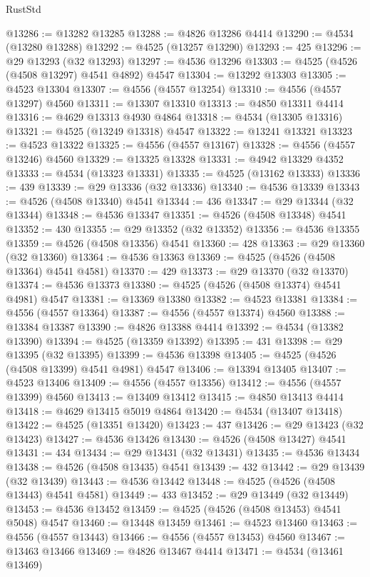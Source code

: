 \begin{lexlean}{RustStd}
\begin{coremodule}
@13286 := @13282 @13285
@13288 := @4826 @13286 @4414
@13290 := @4534 (@13280 @13288)
@13292 := @4525 (@13257 @13290)
@13293 := 425
@13296 := @29 @13293 (@32 @13293)
@13297 := @4536 @13296
@13303 := @4525 (@4526 (@4508 @13297) @4541 @4892) @4547
@13304 := @13292 @13303
@13305 := @4523 @13304
@13307 := @4556 (@4557 @13254)
@13310 := @4556 (@4557 @13297) @4560
@13311 := @13307 @13310
@13313 := @4850 @13311 @4414
@13316 := @4629 @13313 @4930 @4864
@13318 := @4534 (@13305 @13316)
@13321 := @4525 (@13249 @13318) @4547
@13322 := @13241 @13321
@13323 := @4523 @13322
@13325 := @4556 (@4557 @13167)
@13328 := @4556 (@4557 @13246) @4560
@13329 := @13325 @13328
@13331 := @4942 @13329 @4352
@13333 := @4534 (@13323 @13331)
@13335 := @4525 (@13162 @13333)
@13336 := 439
@13339 := @29 @13336 (@32 @13336)
@13340 := @4536 @13339
@13343 := @4526 (@4508 @13340) @4541
@13344 := 436
@13347 := @29 @13344 (@32 @13344)
@13348 := @4536 @13347
@13351 := @4526 (@4508 @13348) @4541
@13352 := 430
@13355 := @29 @13352 (@32 @13352)
@13356 := @4536 @13355
@13359 := @4526 (@4508 @13356) @4541
@13360 := 428
@13363 := @29 @13360 (@32 @13360)
@13364 := @4536 @13363
@13369 := @4525 (@4526 (@4508 @13364) @4541 @4581)
@13370 := 429
@13373 := @29 @13370 (@32 @13370)
@13374 := @4536 @13373
@13380 := @4525 (@4526 (@4508 @13374) @4541 @4981) @4547
@13381 := @13369 @13380
@13382 := @4523 @13381
@13384 := @4556 (@4557 @13364)
@13387 := @4556 (@4557 @13374) @4560
@13388 := @13384 @13387
@13390 := @4826 @13388 @4414
@13392 := @4534 (@13382 @13390)
@13394 := @4525 (@13359 @13392)
@13395 := 431
@13398 := @29 @13395 (@32 @13395)
@13399 := @4536 @13398
@13405 := @4525 (@4526 (@4508 @13399) @4541 @4981) @4547
@13406 := @13394 @13405
@13407 := @4523 @13406
@13409 := @4556 (@4557 @13356)
@13412 := @4556 (@4557 @13399) @4560
@13413 := @13409 @13412
@13415 := @4850 @13413 @4414
@13418 := @4629 @13415 @5019 @4864
@13420 := @4534 (@13407 @13418)
@13422 := @4525 (@13351 @13420)
@13423 := 437
@13426 := @29 @13423 (@32 @13423)
@13427 := @4536 @13426
@13430 := @4526 (@4508 @13427) @4541
@13431 := 434
@13434 := @29 @13431 (@32 @13431)
@13435 := @4536 @13434
@13438 := @4526 (@4508 @13435) @4541
@13439 := 432
@13442 := @29 @13439 (@32 @13439)
@13443 := @4536 @13442
@13448 := @4525 (@4526 (@4508 @13443) @4541 @4581)
@13449 := 433
@13452 := @29 @13449 (@32 @13449)
@13453 := @4536 @13452
@13459 := @4525 (@4526 (@4508 @13453) @4541 @5048) @4547
@13460 := @13448 @13459
@13461 := @4523 @13460
@13463 := @4556 (@4557 @13443)
@13466 := @4556 (@4557 @13453) @4560
@13467 := @13463 @13466
@13469 := @4826 @13467 @4414
@13471 := @4534 (@13461 @13469)

\end{coremodule}
\end{lexlean}

